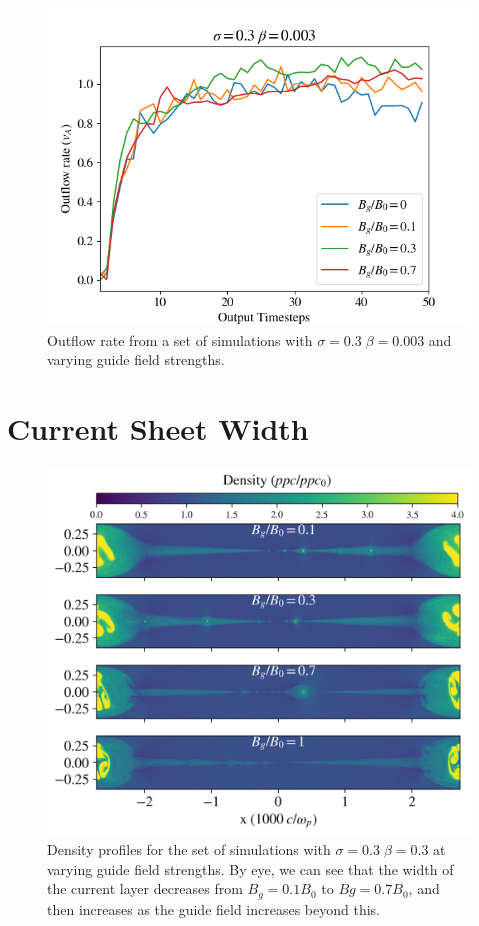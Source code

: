 \documentclass[iop,twocolappendix]{emulateapj}
\begin{document}
\begin{figure}[!h]
	\includegraphics[width=\linewidth]{sig_3_lowbeta_outflows.png}
	\caption{Outflow rate from a set of simulations with $\sigma=0.3 \; \beta=0.003$ and varying guide field strengths. 
	}
	\label{sig.3_lowbeta_outflows}
\end{figure}



\section{Current Sheet Width}
\begin{figure}[!h]
	\includegraphics[width=\linewidth]{sig_3_highbeta_outflow_flds.png}
	\caption{Density profiles for the set of simulations with $\sigma=0.3 \; \beta=0.3$ at varying guide field strengths.  By eye, we can see that the width of the current layer decreases from $B_{g}=0.1 B_{0}$ to $B{g}=0.7B_{0}$, and then increases as the guide field increases beyond this.
	}
	\label{highbeta_outflow_flds}
\end{figure}
\end{document}
